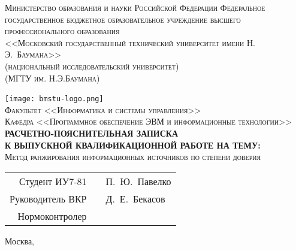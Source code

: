 \newcommand{\HRule}{\rule{\linewidth}{0.5mm}}

\begin{center}
\textsc{Министерство образования и науки Российской Федерации Федеральное государственное бюджетное образовательное учреждение высшего профессионального образования\\
<<Московский государственный технический университет имени Н.\,Э.~Баумана>>\\
(национальный исследовательский университет)\\
(МГТУ им. Н.Э.Баумана)\\}

\texttt{[image: bmstu-logo.png]}~\\

\textsc{Факультет <<Информатика и системы управления>>}\\
\textsc{Кафедра <<Программное обеспечение ЭВМ и информационные технологии>>}\\[1cm]

\textsc{\large \bfseries РАСЧЕТНО-ПОЯСНИТЕЛЬНАЯ ЗАПИСКА\\К ВЫПУСКНОЙ КВАЛИФИКАЦИОННОЙ РАБОТЕ НА ТЕМУ:}\\[1cm]

\textsc{\large Метод ранжирования информационных источников по степени доверия}

\vfill

\begin{flushright}
    \begin{tabular}{rll}
        Студент ИУ7-81 & \underline{\hspace{6cm}} & П.~Ю.~Павелко\\[0.5cm]
        Руководитель ВКР & \underline{\hspace{6cm}} & Д.~Е.~Бекасов\\[0.5cm]
        Нормоконтролер & \underline{\hspace{6cm}} & \underline{\hspace{3cm}}\\[0.5cm]
    \end{tabular}
\end{flushright}

{\large Москва, \the\year}
\end{center}

\newpage
